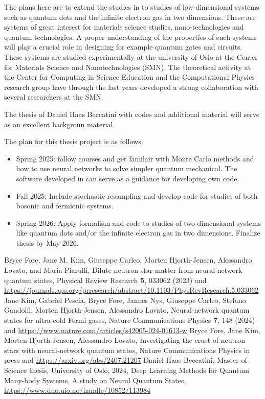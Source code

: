 \documentclass{article}
\begin{document}
The plans here are to extend the studies in \cite{daniel2024} to
studies of low-dimensional systems such as quantum dots and the
infinite electron gas in two dimensions. These are systems of great
interest for materials science studies, nano-technologies and quantum
technologies. A proper understanding of the properties of such systems
will play a crucial role in designing for example quantum gates and
circuits.  These systems are studied experimentally at the university
of Oslo at the Center for Materials Science and Nanotechnologies
(SMN). The theoretical activity at the Center for Computing in Science
Education and the Computational Physics research group have through
the last years developed a strong collaboration with several
researchers at the SMN.

The thesis of Daniel Haas Beccatini \cite{daniel2024} with codes and
additional material will serve as an excellent backgroun material.

The plan for this thesis project is as follows:
\begin{itemize}
\item Spring 2025: follow courses and get familair with Monte Carlo methods
and how to use neural networks to solve simpler quantum
mechanical. The software developed in \cite{daniel2024} can serve as a
guidance for developing own code.
\item Fall 2025: Include stochastic resampling \cite{daniel2024} and develop code for studies of both bosonic and fermionic systems.
\item Spring 2026: Apply formalism and code to studies of two-dimensional systems like quantum dots and/or the infinite electron gas in two dimensions. Finalize thesis by May 2026.
\end{itemize}

\begin{thebibliography}{99}

 Bryce Fore, Jane M. Kim, Giuseppe Carleo, Morten Hjorth-Jensen, Alessandro Lovato, and Maria Piarulli, Dilute neutron star matter from neural-network quantum states, Physical Review Research {\bf 5}, 033062 (2023) and \url{https://journals.aps.org/prresearch/abstract/10.1103/PhysRevResearch.5.033062}
 Jane Kim, Gabriel Pescia, Bryce Fore, Jannes Nys, Giuseppe Carleo, Stefano Gandolfi, Morten Hjorth-Jensen, Alessandro Lovato, Neural-network quantum states for ultra-cold Fermi gases, Nature Communications Physics {\bf 7}, 148 (2024) and \url{https://www.nature.com/articles/s42005-024-01613-w}
 Bryce Fore, Jane Kim, Morten Hjorth-Jensen, Alessandro Lovato, Investigating the crust of neutron stars with neural-network quantum states, Nature Communications Physics in press  and \url{https://arxiv.org/abs/2407.21207}
 Daniel Haas Beccatini, Master of Science thesis, University of Oslo, 2024, Deep Learning Methods for Quantum Many-body Systems, A study on Neural Quantum States, \url{https://www.duo.uio.no/handle/10852/113984}
\end{thebibliography}  
\end{document}
